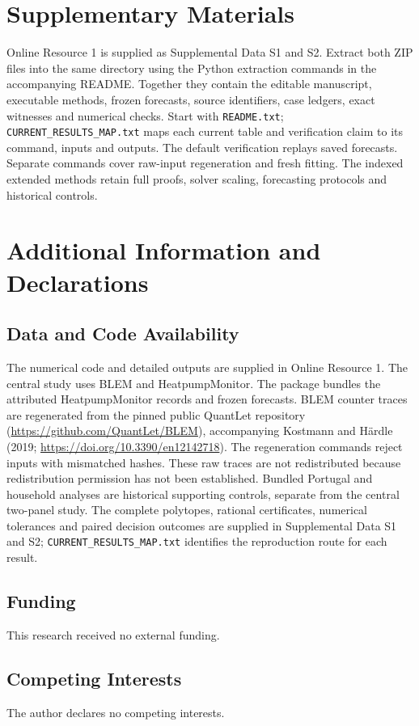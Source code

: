 \section*{Supplementary Materials}
Online Resource 1 is supplied as Supplemental Data S1 and S2. Extract both
ZIP files into the same directory using the Python extraction commands in
the accompanying README. Together they contain the editable manuscript,
executable methods, frozen forecasts, source identifiers, case ledgers,
exact witnesses and numerical checks. Start with \texttt{README.txt};
\texttt{CURRENT\_RESULTS\_MAP.txt} maps each current table and verification
claim to its command, inputs and outputs. The default verification replays
saved forecasts. Separate commands cover raw-input regeneration and fresh
fitting. The indexed extended methods retain full proofs, solver scaling,
forecasting protocols and historical controls.

\section*{Additional Information and Declarations}
\subsection*{Data and Code Availability}
The numerical code and detailed outputs are supplied in Online Resource 1.
The central study uses BLEM and HeatpumpMonitor. The package bundles the
attributed HeatpumpMonitor records and frozen forecasts. BLEM counter traces
are regenerated from the pinned public QuantLet repository
(\url{https://github.com/QuantLet/BLEM}), accompanying Kostmann and H\"ardle
(2019; \url{https://doi.org/10.3390/en12142718}). The regeneration commands
reject inputs with mismatched hashes. These raw traces are not redistributed
because redistribution permission has not been established. Bundled Portugal
and household analyses are historical supporting controls, separate from the
central two-panel study. The complete polytopes, rational certificates,
numerical tolerances and paired decision outcomes are supplied in Supplemental
Data S1 and S2; \texttt{CURRENT\_RESULTS\_MAP.txt} identifies the reproduction
route for each result.

\subsection*{Funding}
This research received no external funding.

\subsection*{Competing Interests}
The author declares no competing interests.

